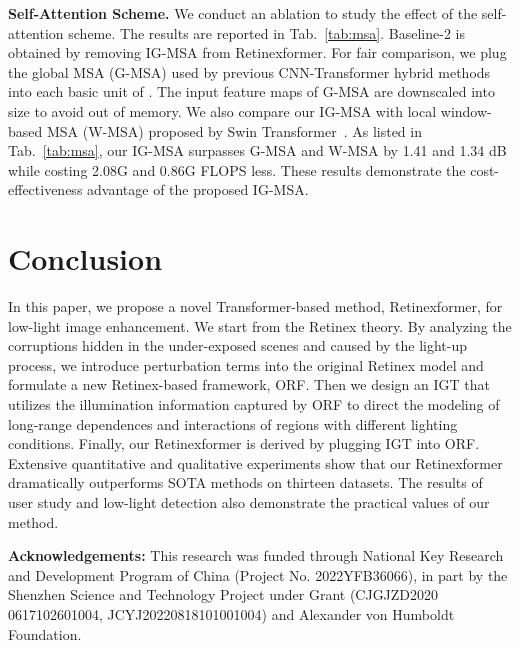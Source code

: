 \documentclass[10pt,twocolumn,letterpaper]{article}
\begin{document}
\vspace{0.5mm}
\noindent\textbf{Self-Attention Scheme.} We conduct an ablation to study the effect of the self-attention scheme. The results are reported in Tab.~\ref{tab:msa}. Baseline-2 is obtained by removing IG-MSA from Retinexformer. For fair comparison, we plug the global MSA (G-MSA) used by previous CNN-Transformer hybrid methods into each basic unit of . The input feature maps of G-MSA are downscaled into  size to avoid out of memory. We also compare our IG-MSA with local window-based MSA (W-MSA) proposed by Swin Transformer~\cite{liu2021swin}. As listed in Tab.~\ref{tab:msa}, our IG-MSA surpasses G-MSA and W-MSA by 1.41 and 1.34 dB while costing 2.08G and 0.86G FLOPS less. These results demonstrate the cost-effectiveness advantage of the proposed IG-MSA.

\vspace{-2mm}
\section{Conclusion}
\vspace{-1mm}
In this paper, we propose a novel Transformer-based method, Retinexformer, for low-light image enhancement. We start from the Retinex theory. By analyzing the corruptions hidden in the under-exposed scenes and caused by the light-up process, we introduce perturbation terms into the original Retinex model and formulate a new Retinex-based framework, ORF.  Then we design an IGT that utilizes the illumination information captured by ORF to direct the modeling of long-range dependences and interactions of regions with different lighting conditions. Finally, our Retinexformer is derived by plugging IGT into ORF. Extensive quantitative and qualitative experiments show that our Retinexformer dramatically outperforms SOTA methods on thirteen datasets. The results of user study and low-light detection also demonstrate the practical values of our method.

\vspace{1mm}

\noindent\textbf{Acknowledgements:} This research was funded through National Key Research and Development Program of China (Project No. 2022YFB36066), in part by the Shenzhen Science and Technology Project under Grant (CJGJZD2020 0617102601004, JCYJ20220818101001004) and Alexander von Humboldt Foundation.

{\small


}
\end{document}
